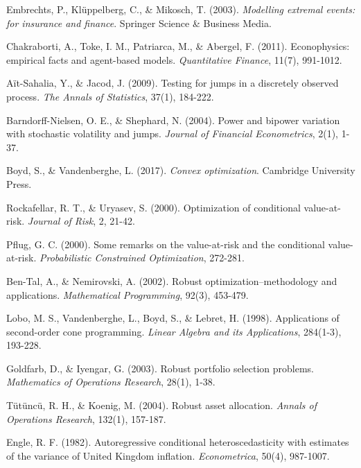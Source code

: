 \documentclass[12pt,a4paper]{article}
\begin{document}
\begin{thebibliography}{99}
Embrechts, P., Klüppelberg, C., \& Mikosch, T. (2003). \textit{Modelling extremal events: for insurance and finance}. Springer Science \& Business Media.

Chakraborti, A., Toke, I. M., Patriarca, M., \& Abergel, F. (2011). Econophysics: empirical facts and agent-based models. \textit{Quantitative Finance}, 11(7), 991-1012.

Aït-Sahalia, Y., \& Jacod, J. (2009). Testing for jumps in a discretely observed process. \textit{The Annals of Statistics}, 37(1), 184-222.

Barndorff-Nielsen, O. E., \& Shephard, N. (2004). Power and bipower variation with stochastic volatility and jumps. \textit{Journal of Financial Econometrics}, 2(1), 1-37.

Boyd, S., \& Vandenberghe, L. (2017). \textit{Convex optimization}. Cambridge University Press.

Rockafellar, R. T., \& Uryasev, S. (2000). Optimization of conditional value-at-risk. \textit{Journal of Risk}, 2, 21-42.

Pflug, G. C. (2000). Some remarks on the value-at-risk and the conditional value-at-risk. \textit{Probabilistic Constrained Optimization}, 272-281.

Ben-Tal, A., \& Nemirovski, A. (2002). Robust optimization–methodology and applications. \textit{Mathematical Programming}, 92(3), 453-479.

Lobo, M. S., Vandenberghe, L., Boyd, S., \& Lebret, H. (1998). Applications of second-order cone programming. \textit{Linear Algebra and its Applications}, 284(1-3), 193-228.

Goldfarb, D., \& Iyengar, G. (2003). Robust portfolio selection problems. \textit{Mathematics of Operations Research}, 28(1), 1-38.

Tütüncü, R. H., \& Koenig, M. (2004). Robust asset allocation. \textit{Annals of Operations Research}, 132(1), 157-187.

Engle, R. F. (1982). Autoregressive conditional heteroscedasticity with estimates of the variance of United Kingdom inflation. \textit{Econometrica}, 50(4), 987-1007.


\end{thebibliography}
\end{document}
